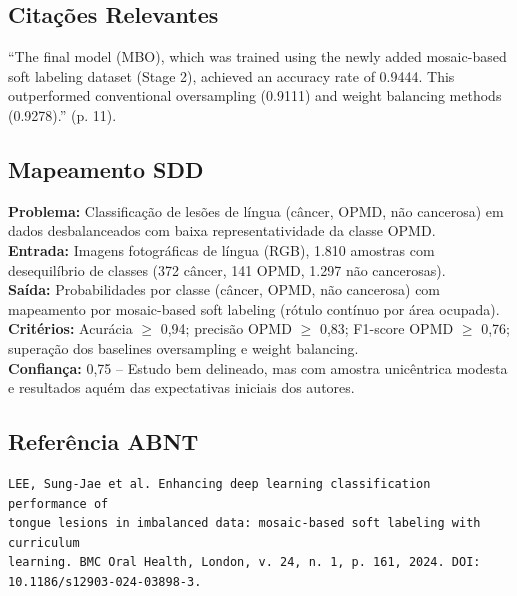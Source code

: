 \subsection{Citações Relevantes}
\begin{citacao}
``The final model (MBO), which was trained using the newly added mosaic-based
soft labeling dataset (Stage 2), achieved an accuracy rate of 0.9444. This
outperformed conventional oversampling (0.9111) and weight balancing methods
(0.9278).'' (p. 11).
\end{citacao}

\subsection{Mapeamento SDD}
\textbf{Problema:} Classificação de lesões de língua (câncer, OPMD, não cancerosa)
em dados desbalanceados com baixa representatividade da classe OPMD. \\
\textbf{Entrada:} Imagens fotográficas de língua (RGB), 1.810 amostras com
desequilíbrio de classes (372 câncer, 141 OPMD, 1.297 não cancerosas). \\
\textbf{Saída:} Probabilidades por classe (câncer, OPMD, não cancerosa) com
mapeamento por mosaic-based soft labeling (rótulo contínuo por área ocupada). \\
\textbf{Critérios:} Acurácia $\geq$ 0,94; precisão OPMD $\geq$ 0,83; F1-score
OPMD $\geq$ 0,76; superação dos baselines oversampling e weight balancing. \\
\textbf{Confiança:} 0,75 -- Estudo bem delineado, mas com amostra unicêntrica
modesta e resultados aquém das expectativas iniciais dos autores.

\subsection{Referência ABNT}
\begin{verbatim}
LEE, Sung-Jae et al. Enhancing deep learning classification performance of
tongue lesions in imbalanced data: mosaic-based soft labeling with curriculum
learning. BMC Oral Health, London, v. 24, n. 1, p. 161, 2024. DOI:
10.1186/s12903-024-03898-3.
\end{verbatim}
